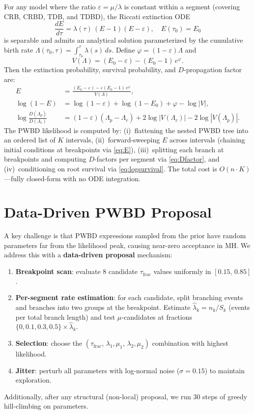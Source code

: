 \documentclass[11pt,a4paper]{article}
\begin{document}
For any model where the ratio $\varepsilon = \mu/\lambda$ is constant within a segment
(covering CRB, CRBD, TDB, and TDBD), the Riccati extinction ODE
\[
  \frac{dE}{d\tau} = \lambda(\tau)\,(E-1)(E-\varepsilon), \quad E(\tau_0)=E_0
\]
is separable and admits an analytical solution parameterized by the cumulative birth rate
$\Lambda(\tau_0,\tau) = \int_{\tau_0}^{\tau}\lambda(s)\,ds$.
Define $\varphi = (1-\varepsilon)\Lambda$ and
\[
  V(\Lambda) = (E_0-\varepsilon) - (E_0-1)\,e^{\varphi}.
\]
Then the extinction probability, survival probability, and $D$-propagation factor are:
\begin{align}
  E &= \frac{(E_0-\varepsilon) - \varepsilon(E_0-1)\,e^{\varphi}}{V(\Lambda)}, \label{eq:E}\\[4pt]
  \log(1-E) &= \log(1{-}\varepsilon) + \log(1{-}E_0) + \varphi - \log|V|, \label{eq:logsurvival}\\[4pt]
  \log \frac{D(\Lambda_p)}{D(\Lambda_c)}
    &= (1{-}\varepsilon)(\Lambda_p - \Lambda_c) + 2\log|V(\Lambda_c)| - 2\log|V(\Lambda_p)|. \label{eq:Dfactor}
\end{align}
The PWBD likelihood is computed by:
(i)~flattening the nested PWBD tree into an ordered list of $K$ intervals,
(ii)~forward-sweeping $E$ across intervals (chaining initial conditions at breakpoints via \eqref{eq:E}),
(iii)~splitting each branch at breakpoints and computing $D$-factors per segment via \eqref{eq:Dfactor},
and (iv)~conditioning on root survival via \eqref{eq:logsurvival}.
The total cost is $O(n \cdot K)$---fully closed-form with no ODE integration.

\section{Data-Driven PWBD Proposal}

A key challenge is that PWBD expressions sampled from the prior have random parameters
far from the likelihood peak, causing near-zero acceptance in MH.
We address this with a \textbf{data-driven proposal} mechanism:

\begin{enumerate}[nosep]
  \item \textbf{Breakpoint scan}: evaluate 8 candidate $\tau_{\mathrm{frac}}$ values uniformly in $[0.15,\, 0.85]$.
  \item \textbf{Per-segment rate estimation}: for each candidate,
        split branching events and branches into two groups at the breakpoint.
        Estimate $\hat\lambda_k = n_k / S_k$ (events per total branch length)
        and test $\mu$-candidates at fractions $\{0, 0.1, 0.3, 0.5\} \times \hat\lambda_k$.
  \item \textbf{Selection}: choose the $(\tau_{\mathrm{frac}},\, \lambda_1, \mu_1,\, \lambda_2, \mu_2)$
        combination with highest likelihood.
  \item \textbf{Jitter}: perturb all parameters with log-normal noise ($\sigma=0.15$) to maintain exploration.
\end{enumerate}
Additionally, after any structural (non-local) proposal, we run 30 steps of greedy hill-climbing on parameters.
\end{document}
